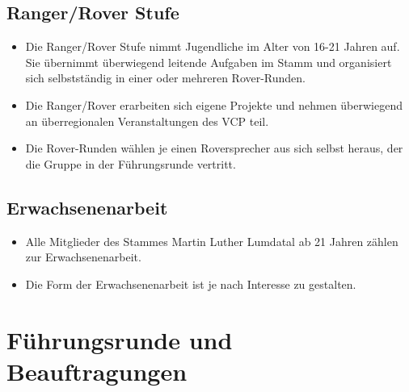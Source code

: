 \documentclass[a4paper]{article}
\begin{document}
    \subsection{Ranger/Rover Stufe} %
    \label{sub:ranger_rover_stufe}
        \begin{itemize}
            \item Die Ranger/Rover Stufe nimmt Jugendliche im Alter von 16-21 Jahren auf. Sie übernimmt überwiegend leitende Aufgaben im Stamm und organisiert sich selbstständig in einer oder mehreren Rover-Runden. 
            \item Die Ranger/Rover erarbeiten sich eigene Projekte und nehmen überwiegend an überregionalen Veranstaltungen des VCP teil. 
            \item Die Rover-Runden wählen je einen Roversprecher aus sich selbst heraus, der die Gruppe in der Führungsrunde vertritt.
        \end{itemize}
    
    \subsection{Erwachsenenarbeit} %
    \label{sub:erwachsenenarbeit}
	\begin{itemize}
		\item Alle Mitglieder des Stammes Martin Luther Lumdatal ab 21 Jahren zählen zur Erwachsenenarbeit. 
		\item Die Form der Erwachsenenarbeit ist je nach Interesse zu gestalten. 
	\end{itemize}

\section{Führungsrunde und Beauftragungen} %
\label{sec:fuhrungsrunde_und_beauftragungen}
\end{document}
